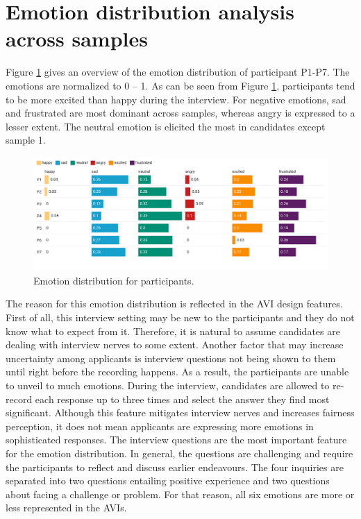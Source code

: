 \section{Emotion distribution analysis across samples}
\label{sec:emotion_distribution_analysis}
Figure \ref{fig:emotion_distribution} gives an overview of the emotion distribution of participant P1-P7. The emotions are normalized to 0 -- 1. As can be seen from Figure \ref{fig:emotion_distribution}, participants tend to be more excited than happy during the interview. For negative emotions, sad and frustrated are most dominant across samples, whereas angry is expressed to a lesser extent. The neutral emotion is elicited the most in candidates except sample 1. 
%
\begin{figure}[h]
  \centering
  \includegraphics[width=\textwidth]{figures/emotion_dist_all.png}
  \caption{Emotion distribution for participants.}
  \label{fig:emotion_distribution}
\end{figure}
%
The reason for this emotion distribution is reflected in the AVI design features. First of all, this interview setting may be new to the participants and they do not know what to expect from it. Therefore, it is natural to assume candidates are dealing with interview nerves to some extent. Another factor that may increase uncertainty among applicants is interview questions not being shown to them until right before the recording happens. As a result, the participants are unable to unveil to much emotions. During the interview, candidates are allowed to re-record each response up to three times and select the answer they find most significant. Although this feature mitigates interview nerves and increases fairness perception, it does not mean applicants are expressing more emotions in sophisticated responses. The interview questions are the most important feature for the emotion distribution. In general, the questions are challenging and require the participants to reflect and discuss earlier endeavours. The four inquiries are separated into two questions entailing positive experience and two questions about facing a challenge or problem. For that reason, all six emotions are more or less represented in the AVIs. 

